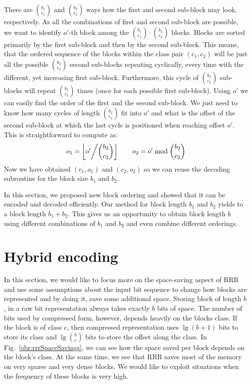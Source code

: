 There are ${b_1 \choose c_1}$ and ${b_2 \choose c_2}$ ways how the first and second
sub-block may look, respectively. As all the combinations of first and second sub-block are
possible, we want to identify $o'$-th block among the ${b_1 \choose c_1}\cdot {b_2 \choose c_2}$
blocks. Blocks are sorted primarily by the first sub-block and then by the second sub-block.
This means, that the ordered sequence of the blocks within the class pair $(c_1, c_2)$ will be
just all the possible ${b_2 \choose c_2}$ second sub-blocks repeating cyclically, every time
with the different, yet increasing first sub-block. Furthermore, this cycle of
${b_2 \choose c_2}$ sub-blocks will repeat ${b_1 \choose c_1}$ times (once for each possible
first sub-block). Using $o'$ we can easily find the order of the first and the second sub-block.
We just need to know how many cycles of length ${b_2 \choose c_2}$ fit into $o'$ and what is
the offset of the second sub-block at which the last cycle is positioned when reaching 
offset $o'$. This is straightforward to compute as:
$$o_1 = \left\lfloor o' \middle/{b_2 \choose c_2} \right\rfloor\qquad o_2 = o'\bmod {b_2 \choose c_2}$$
Now we have obtained $(c_1, o_1)$ and $(c_2, o_2)$ so we can reuse the decoding subroutine for the
block size $b_1$ and $b_2$.

In this section, we proposed new block ordering and showed that it can be encoded and decoded
efficiently. Our method for block length $b_1$ and $b_2$ yields to a block length $b_1+b_2$.
This gives us an opportunity to obtain block length $b$ using different combinations of $b_1$
and $b_2$ and even combine different orderings.

\section{Hybrid encoding}


In this section, we would like to focus more on the space-saving aspect of RRR and use some
assumptions about the input bit sequence to change how blocks are represented and by doing
it, save some additional space. Storing block of length $b$, in a raw bit representation
always takes exactly $b$ bits of space. The number of bits used by compressed form, however,
depends heavily on the blocks class. If the block is of class $c$, then compressed
representation uses $\lg (b+1)$ bits to store its class and $\lg {b\choose c}$
bits to store the offset along the class. In Fig.~\ref{obr:rrrSpaceSavings}, we can see
how the space saved per block depends on the block’s class. At the same time, we see
that RRR saves most of the memory on very sparse and very dense blocks. We would like
to exploit situations when the frequency of these blocks is very high.

